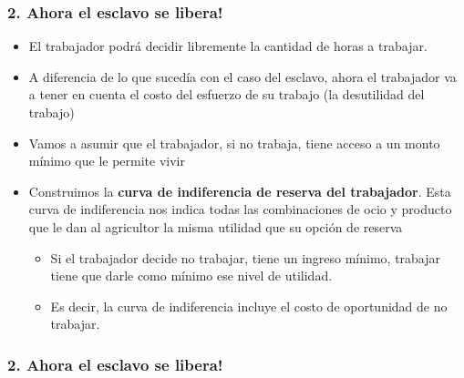 \documentclass{beamer}
\begin{document}
\begin{frame}
\frametitle{2. Ahora el esclavo se libera!}
        \begin{itemize}
            \item El trabajador podrá decidir libremente la cantidad de horas a trabajar.
            \item A diferencia de lo que sucedía con el caso del esclavo, ahora el trabajador va a tener en cuenta el costo del esfuerzo de su trabajo (la desutilidad del trabajo)  \vspace{1mm}
            \item Vamos a asumir que el trabajador, si no trabaja, tiene acceso a un monto mínimo que le permite vivir \vspace{1mm}
            \item Construimos la \textbf{curva de indiferencia de reserva del trabajador}. Esta curva de indiferencia nos indica todas las combinaciones de ocio y producto que le dan al agricultor la misma utilidad que su opción de reserva
            \begin{itemize}
                \item Si el trabajador decide no trabajar, tiene un ingreso mínimo, trabajar tiene que darle como mínimo ese nivel de utilidad.
                \item Es decir, la curva de indiferencia incluye el costo de oportunidad de no trabajar.
            \end{itemize}
    \end{itemize}
\end{frame}

\begin{frame}
\frametitle{2. Ahora el esclavo se libera!}
\begin{center}
\begin{figure}[H]
\renewcommand{\figurename}{Figure}
\begin{center}
\end{center}
\end{figure}
\end{center}
\end{frame}
\end{document}
